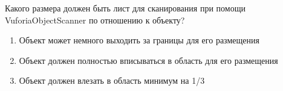 
Какого размера должен быть лист для сканирования при помощи VuforiaObjectScanner по отношению к объекту?

\begin{enumerate}
    \item Объект может немного выходить за границы для его размещения
    \item Объект должен полностью вписываться в область для его размещения
    \item Объект должен влезать в область минимум на 1/3
\end{enumerate}